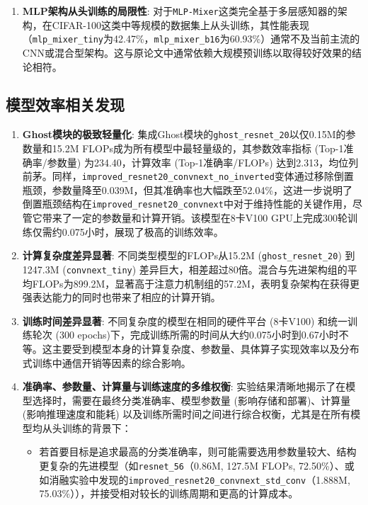 \documentclass[a4paper]{article}
\begin{document}
\begin{description}
\begin{enumerate}
    \item \textbf{MLP架构从头训练的局限性}: 对于\texttt{MLP-Mixer}这类完全基于多层感知器的架构，在CIFAR-100这类中等规模的数据集上从头训练，其性能表现（\texttt{mlp\_mixer\_tiny}为42.47\%，\texttt{mlp\_mixer\_b16}为60.93\%）通常不及当前主流的CNN或混合型架构。这与原论文中通常依赖大规模预训练以取得较好效果的结论相符。
\end{enumerate}

\subsection{模型效率相关发现}
\begin{enumerate}
    \item \textbf{Ghost模块的极致轻量化}: 集成Ghost模块的\texttt{ghost\_resnet\_20}以仅0.15M的参数量和15.2M FLOPs成为所有模型中最轻量级的，其参数效率指标 (Top-1准确率/参数量) 为234.40，计算效率 (Top-1准确率/FLOPs) 达到2.313，均位列前茅。同样，\texttt{improved\_resnet20\_convnext\_no\_inverted}变体通过移除倒置瓶颈，参数量降至0.039M，但其准确率也大幅跌至52.04\%，这进一步说明了倒置瓶颈结构在\texttt{improved\_resnet20\_convnext}中对于维持性能的关键作用，尽管它带来了一定的参数量和计算开销。该模型在8卡V100 GPU上完成300轮训练仅需约0.075小时，展现了极高的训练效率。
    \item \textbf{计算复杂度差异显著}: 不同类型模型的FLOPs从15.2M (\texttt{ghost\_resnet\_20}) 到1247.3M (\texttt{convnext\_tiny}) 差异巨大，相差超过80倍。混合与先进架构组的平均FLOPs为899.2M，显著高于注意力机制组的57.2M，表明复杂架构在获得更强表达能力的同时也带来了相应的计算开销。
    \item \textbf{训练时间差异显著}: 不同复杂度的模型在相同的硬件平台 (8卡V100) 和统一训练轮次 (300 epochs)下，完成训练所需的时间从大约0.075小时到0.67小时不等。这主要受到模型本身的计算复杂度、参数量、具体算子实现效率以及分布式训练中通信开销等因素的综合影响。
    \item \textbf{准确率、参数量、计算量与训练速度的多维权衡}: 实验结果清晰地揭示了在模型选择时，需要在最终分类准确率、模型参数量 (影响存储和部署)、计算量 (影响推理速度和能耗) 以及训练所需时间之间进行综合权衡，尤其是在所有模型均从头训练的背景下：
        \begin{itemize}
            \item 若首要目标是追求最高的分类准确率，则可能需要选用参数量较大、结构更复杂的先进模型（如\texttt{resnet\_56}（0.86M, 127.5M FLOPs, 72.50\%）、或如消融实验中发现的\texttt{improved\_resnet20\_convnext\_std\_conv}（1.888M, 75.03\%）），并接受相对较长的训练周期和更高的计算成本。

\end{itemize}
\end{enumerate}
\end{description}
\end{document}
